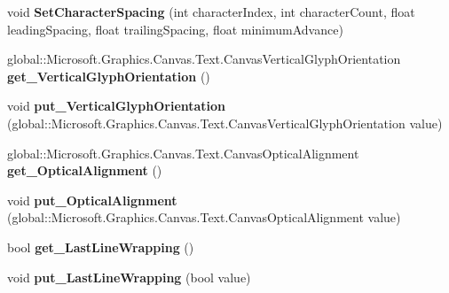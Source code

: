 \begin{DoxyCompactItemize}
void {\bfseries Set\+Character\+Spacing} (int character\+Index, int character\+Count, float leading\+Spacing, float trailing\+Spacing, float minimum\+Advance)
\item 
\mbox{\label{class_microsoft_1_1_graphics_1_1_canvas_1_1_text_1_1_canvas_text_layout_afd275d5017f0ed4abf5747b6611ba137}} 
global\+::\+Microsoft.\+Graphics.\+Canvas.\+Text.\+Canvas\+Vertical\+Glyph\+Orientation {\bfseries get\+\_\+\+Vertical\+Glyph\+Orientation} ()
\item 
\mbox{\label{class_microsoft_1_1_graphics_1_1_canvas_1_1_text_1_1_canvas_text_layout_a45f5e962fa229c96404257c75c6a3a3c}} 
void {\bfseries put\+\_\+\+Vertical\+Glyph\+Orientation} (global\+::\+Microsoft.\+Graphics.\+Canvas.\+Text.\+Canvas\+Vertical\+Glyph\+Orientation value)
\item 
\mbox{\label{class_microsoft_1_1_graphics_1_1_canvas_1_1_text_1_1_canvas_text_layout_a9de04b11cf865c89c4a76010e49b21ac}} 
global\+::\+Microsoft.\+Graphics.\+Canvas.\+Text.\+Canvas\+Optical\+Alignment {\bfseries get\+\_\+\+Optical\+Alignment} ()
\item 
\mbox{\label{class_microsoft_1_1_graphics_1_1_canvas_1_1_text_1_1_canvas_text_layout_af03396a3ef4783d99224c7d1ed1fb4c8}} 
void {\bfseries put\+\_\+\+Optical\+Alignment} (global\+::\+Microsoft.\+Graphics.\+Canvas.\+Text.\+Canvas\+Optical\+Alignment value)
\item 
\mbox{\label{class_microsoft_1_1_graphics_1_1_canvas_1_1_text_1_1_canvas_text_layout_aa574a94412591998ea88bcf6050fde56}} 
bool {\bfseries get\+\_\+\+Last\+Line\+Wrapping} ()
\item 
\mbox{\label{class_microsoft_1_1_graphics_1_1_canvas_1_1_text_1_1_canvas_text_layout_a23ffd7a9bc9689000496a12211b36095}} 
void {\bfseries put\+\_\+\+Last\+Line\+Wrapping} (bool value)
\item 

\end{DoxyCompactItemize}
